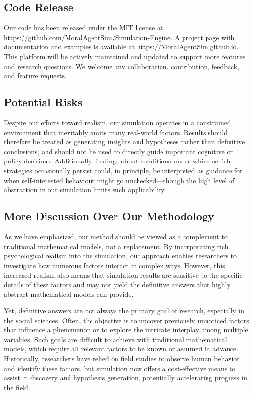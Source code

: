 \subsection{Code Release}
Our code has been released under the MIT license at \url{https://github.com/MoralAgentSim/Simulation-Engine}. A project page with documentation and examples is available at \url{https://MoralAgentSim.github.io}.
This platform will be actively maintained and updated to support more features and research questions. We welcome any collaboration, contribution, feedback, and feature requests.

\subsection{Potential Risks}
Despite our efforts toward realism, our simulation operates in a constrained environment that inevitably omits many real-world factors. Results should therefore be treated as generating insights and hypotheses rather than definitive conclusions, and should not be used to directly guide important cognitive or policy decisions. Additionally, findings about conditions under which selfish strategies occasionally persist could, in principle, be interpreted as guidance for when self-interested behaviour might go unchecked---though the high level of abstraction in our simulation limits such applicability.

\subsection{More Discussion Over Our Methodology}
As we have emphasized, our method should be viewed as a complement to traditional mathematical models, not a replacement. By incorporating rich psychological realism into the simulation, our approach enables researchers to investigate how numerous factors interact in complex ways. However, this increased realism also means that simulation results are sensitive to the specific details of these factors and may not yield the definitive answers that highly abstract mathematical models can provide.

Yet, definitive answers are not always the primary goal of research, especially in the social sciences. Often, the objective is to uncover previously unnoticed factors that influence a phenomenon or to explore the intricate interplay among multiple variables. Such goals are difficult to achieve with traditional mathematical models, which require all relevant factors to be known or assumed in advance. Historically, researchers have relied on field studies to observe human behavior and identify these factors, but simulation now offers a cost-effective means to assist in discovery and hypothesis generation, potentially accelerating progress in the field.

